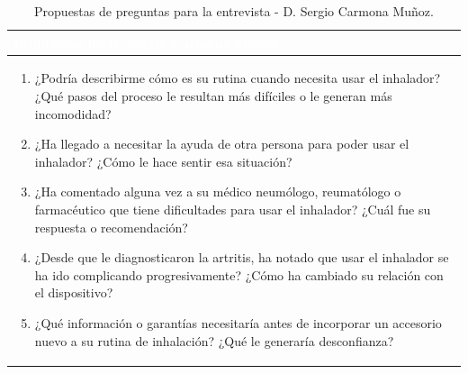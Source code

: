 \documentclass[11pt,a4paper]{article}
\begin{document}
\begin{table}[H]
    \centering
    \small
    \renewcommand{\arraystretch}{1.5}
    \begin{tabularx}{\linewidth}{|X|}
        \hline
        \rowcolor{ArthroNavy}
        \textcolor{white}{\textbf{Propuestas de D. Sergio Carmona Muñoz}} \\ \hline
        \vspace{0.1cm}
        \begin{enumerate}[leftmargin=0.8cm, itemsep=0.2cm]
            \item ¿Podría describirme cómo es su rutina cuando necesita usar el inhalador? ¿Qué pasos del proceso le resultan más difíciles o le generan más incomodidad?
            \item ¿Ha llegado a necesitar la ayuda de otra persona para poder usar el inhalador? ¿Cómo le hace sentir esa situación?
            \item ¿Ha comentado alguna vez a su médico neumólogo, reumatólogo o farmacéutico que tiene dificultades para usar el inhalador? ¿Cuál fue su respuesta o recomendación?
            \item ¿Desde que le diagnosticaron la artritis, ha notado que usar el inhalador se ha ido complicando progresivamente? ¿Cómo ha cambiado su relación con el dispositivo?
            \item ¿Qué información o garantías necesitaría antes de incorporar un accesorio nuevo a su rutina de inhalación? ¿Qué le generaría desconfianza?
        \end{enumerate}
        \vspace{0.1cm} \\ \hline
    \end{tabularx}
    \caption{Propuestas de preguntas para la entrevista - D. Sergio Carmona Muñoz.}
    \label{tab:preguntas_sergio}
\end{table}

\vspace{0.4cm}
\end{document}
